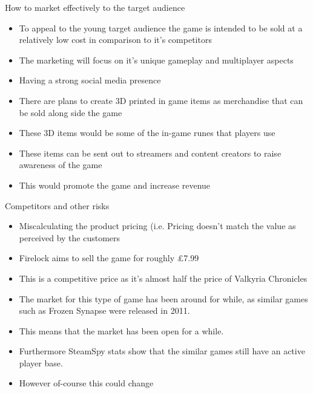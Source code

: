 \documentclass{beamer}
\begin{document}
\begin{frame}{How to market effectively to the target audience}
	 \pause
	\begin{itemize}
		\item To appeal to the young target audience the game is intended to be sold at a relatively low cost in comparison to it's competitors \pause
		\item The marketing will focus on it's unique gameplay and multiplayer aspects \pause
		\item Having a strong social media presence \pause
	\end{itemize}	
	
	 \pause
	\begin{itemize}
		\item There are plans to create 3D printed in game items as merchandise that can be sold along side the game \pause
		\item These 3D items would be some of the in-game runes that players use \pause
		\item These items can be sent out to streamers and content creators to raise awareness of the game \pause
		\item This would promote the game and increase revenue \pause
	\end{itemize}
	
	
\end{frame}

\begin{frame}{Competitors and other risks}
	 \pause
	\begin{itemize}
		\item Miscalculating the product pricing (i.e. Pricing doesn't match the value as perceived by the customers \pause
		\item Firelock aims to sell the game for roughly \pounds 7.99 \pause
		\item This is a competitive price as it's almost half the price of Valkyria Chronicles \pause

	\end{itemize}
	 \pause
	\begin {itemize}
		\item The market for this type of game has been around for while, as similar games such as Frozen Synapse were released in 2011. \pause
		\item This means that the market has been open for a while. \pause
		\item Furthermore SteamSpy stats show that the similar games still have an active player base. \pause %
		\item However of-course this could change \pause
	\end{itemize}
	

\end{frame}
\end{document}

